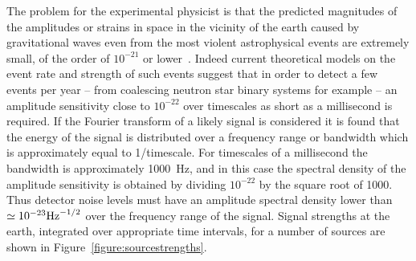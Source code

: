 \documentclass{article}
\begin{document}
The problem for the experimental physicist is that the predicted magnitudes of
the amplitudes or strains in space in the vicinity of the earth caused by
gravitational waves even from the most violent astrophysical events are
extremely small, of the order of $10^{-21}$ or lower~\cite{Sathyaprakash:2009,
LISAsymposium}. Indeed current theoretical models on the event rate and strength
of such events suggest that in order to detect a few events per year -- from
coalescing neutron star binary systems for example -- an amplitude sensitivity
close to $10^{-22}$ over timescales as short as a millisecond is required. If
the Fourier transform of a likely signal is considered it is found that the
energy of the signal is distributed over a frequency range or bandwidth which is
approximately equal to 1/timescale.  For timescales of a millisecond the
bandwidth is approximately 1000~Hz, and in this case the spectral density of the
amplitude sensitivity is obtained by dividing $10^{-22}$ by the square root of
1000. Thus detector noise levels must have an amplitude spectral density lower
than $\simeq 10^{-23}{\rm Hz}^{-1/2}$ over the frequency range of the signal.
Signal strengths at the earth, integrated over appropriate time intervals, for a
number of sources are shown in Figure~\ref{figure:sourcestrengths}.

\end{document}
